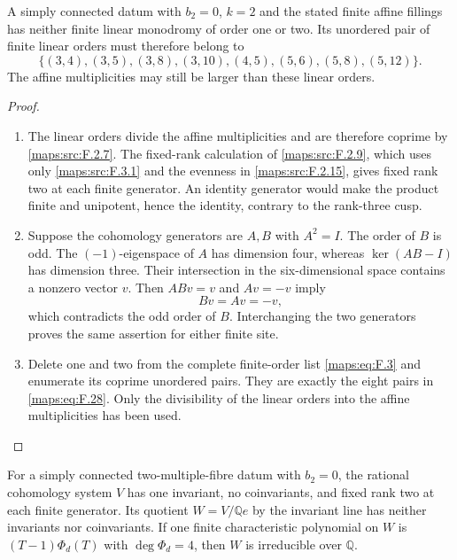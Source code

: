 \begin{proposition}\label{maps:src:F.2.8}


A simply connected datum with $b_2=0$, $k=2$ and the stated
finite affine fillings has neither finite linear
monodromy of order one or two.  Its unordered pair of finite
linear orders must therefore belong to
\[
 \{(3,4),(3,5),(3,8),(3,10),(4,5),
       (5,6),(5,8),(5,12)\}.
 \tag{F.28}\label{maps:eq:F.28}
\]
The affine multiplicities may still be larger than these
linear orders.

\end{proposition}


\begin{proof}
\begin{enumerate}[label=\arabic*.]
\item The linear orders divide the affine multiplicities and are
therefore coprime by \ref{maps:src:F.2.7}.  The fixed-rank calculation
of \ref{maps:src:F.2.9}, which uses only \ref{maps:src:F.3.1} and the
evenness in \ref{maps:src:F.2.15}, gives fixed rank two at each finite
generator.  An identity generator would make the product finite and
unipotent, hence the identity, contrary to the rank-three cusp.

\item Suppose the cohomology generators are $A,B$ with $A^2=I$.
The order of $B$ is odd.  The $(-1)$-eigenspace of $A$ has dimension
four, whereas $\ker(AB-I)$ has dimension three.  Their intersection
in the six-dimensional space contains a nonzero vector $v$.
Then $ABv=v$ and $Av=-v$ imply
\[
 Bv=Av=-v,
\]
which contradicts the odd order of $B$.  Interchanging the two
generators proves the same assertion for either finite site.

\item Delete one and two from the complete finite-order list
\eqref{maps:eq:F.3} and enumerate its coprime unordered pairs.
They are exactly the eight pairs in \eqref{maps:eq:F.28}.
Only the divisibility of the linear orders into the affine
multiplicities has been used.
\end{enumerate}
\end{proof}




\begin{proposition}\label{maps:src:F.2.9}


For a simply connected two-multiple-fibre datum with $b_2=0$,
the rational
cohomology system $V$ has one invariant, no coinvariants,
and fixed rank two at each finite generator.  Its quotient
$W=V/\mathbb Qe$ by the invariant line has neither invariants
nor coinvariants.  If one finite characteristic polynomial
on $W$ is $(T-1)\Phi_d(T)$ with $\deg\Phi_d=4$, then $W$
is irreducible over $\mathbb Q$.

\end{proposition}


